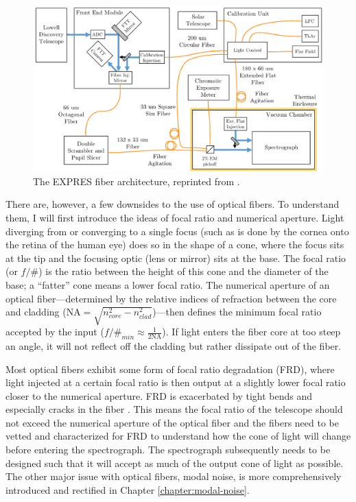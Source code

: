 \begin{figure}
    \centering
    \includegraphics[width=\textwidth]{figures-1/expres_schematic_fibersV3.pdf}
    \caption{The EXPRES fiber architecture, reprinted from \citet{blackman_performance_2020}.}
    \label{fig:expres-fibers}
\end{figure}

There are, however, a few downsides to the use of optical fibers. To understand them, I will first introduce the ideas of focal ratio and numerical aperture. Light diverging from or converging to a single focus (such as is done by the cornea onto the retina of the human eye) does so in the shape of a cone, where the focus sits at the tip and the focusing optic (lens or mirror) sits at the base. The focal ratio (or $f/\#$) is the ratio between the height of this cone and the diameter of the base; a ``fatter'' cone means a lower focal ratio. The numerical aperture of an optical fiber---determined by the relative indices of refraction between the core and cladding ($\mathrm{NA}=\sqrt{n_{core}^2-n_{clad}^2}$)---then defines the minimum focal ratio accepted by the input ($f/\#_{min} \approx \frac{1}{2\mathrm{NA}}$). If light enters the fiber core at too steep an angle, it will not reflect off the cladding but rather dissipate out of the fiber.

Most optical fibers exhibit some form of focal ratio degradation (FRD), where light injected at a certain focal ratio is then output at a slightly lower focal ratio closer to the numerical aperture. FRD is exacerbated by tight bends and especially cracks in the fiber \citep{ramsey_focal_1988}. This means the focal ratio of the telescope should not exceed the numerical aperture of the optical fiber and the fibers need to be vetted and characterized for FRD to understand how the cone of light will change before entering the spectrograph. The spectrograph subsequently needs to be designed such that it will accept as much of the output cone of light as possible. The other major issue with optical fibers, modal noise, is more comprehensively introduced and rectified in Chapter \ref{chapter:modal-noise}.

